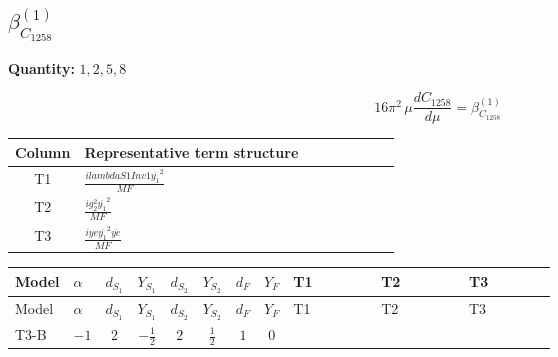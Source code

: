 \documentclass[8pt]{article}
\begin{document}
\begin{landscape}
\section*{$\beta_{C_{1258}}^{(1)}$}
\noindent\textbf{Quantity: }$\mathrm{1,2,5,8}$\par\smallskip
\[16\pi^2\,\mu\frac{d C_{1258}}{d\mu}=\beta_{C_{1258}}^{(1)}\]
\begin{center}
\begin{tabular}{@{}c >{\raggedright\arraybackslash}p{0.82\linewidth}@{}}
\toprule
Column & Representative term structure \\
\midrule
T1 & \(\displaystyle \frac{i lambdaS1Inv1 \overline{y_{1}}^{2}}{MF}\) \\
\midrule
T2 & \(\displaystyle \frac{i g_{2}^{2} \overline{y_{1}}^{2}}{MF}\) \\
\midrule
T3 & \(\displaystyle \frac{i ye \overline{y_{1}}^{2} \overline{ye}}{MF}\) \\
\midrule
\bottomrule
\end{tabular}
\end{center}
\smallskip
\tiny
\begin{longtable}{@{}llcccccc >{\raggedright\arraybackslash}p{0.21\linewidth} >{\raggedright\arraybackslash}p{0.21\linewidth} >{\raggedright\arraybackslash}p{0.21\linewidth}@{}}
\toprule
Model & $\alpha$ & $d_{S_1}$ & $Y_{S_1}$ & $d_{S_2}$ & $Y_{S_2}$ & $d_F$ & $Y_F$ & T1 & T2 & T3 \\
\midrule
\endfirsthead
\toprule
Model & $\alpha$ & $d_{S_1}$ & $Y_{S_1}$ & $d_{S_2}$ & $Y_{S_2}$ & $d_F$ & $Y_F$ & T1 & T2 & T3 \\
\midrule
\endhead
T3-B & $-1$ & $2$ & $-\frac{1}{2}$ & $2$ & $\frac{1}{2}$ & $1$ & $0$ & \scriptsize\adjustbox{max width=\linewidth}{$\begin{gathered} \frac{i lambdaS1Inv1 \overline{y_{1}}^{2}}{4 MF}\end{gathered}$} & \scriptsize\adjustbox{max width=\linewidth}{$\begin{gathered} \frac{3 i g_{2}^{2} \overline{y_{1}}^{2}}{8 MF}\end{gathered}$} & \scriptsize\adjustbox{max width=\linewidth}{$\begin{gathered} - \frac{i ye \overline{y_{1}}^{2} \overline{ye}}{8 MF}\end{gathered}$} \\
\midrule
\bottomrule
\end{longtable}
\clearpage

\end{landscape}
\end{document}
